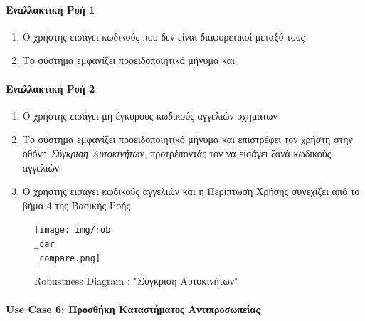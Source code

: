 \documentclass{../ol-softwaremanual}
\begin{document}
	\paragraph{Εναλλακτική Ροή 1}

	\begin{enumerate}
		\item Ο χρήστης εισάγει κωδικούς που δεν είναι διαφορετικοί μεταξύ τους
		\item Το σύστημα εμφανίζει προειδοποιητικό μήνυμα και  
	\end{enumerate}

	\paragraph{Εναλλακτική Ροή 2}
	\begin{enumerate}
		\item Ο χρήστης εισάγει μη-έγκυρους κωδικούς αγγελιών οχημάτων
		\item Το σύστημα εμφανίζει προειδοποιητικό μήνυμα και επιστρέφει τον χρήστη στην οθόνη \textit{Σύγκριση Αυτοκινήτων}, προτρέποντάς τον να εισάγει ξανά κωδικούς αγγελιών
		\item Ο χρήστης εισάγει κωδικούς αγγελιών και η Περίπτωση Χρήσης συνεχίζει από το βήμα 4 της Βασικής Ροής		
	\end{enumerate}
	
	
	\begin{figure}[htbp!]
		\texttt{[image: img/rob\\\_car\\\_compare.png]}
		\caption{\en Robustness Diagram : "\gr Σύγκριση Αυτοκινήτων\en"\gr}
	\end{figure}
	
	\newpage
	\centering
	\paragraph{\en Use Case 6: \gr Προσθήκη Καταστήματος Αντιπροσωπείας}
\end{document}
